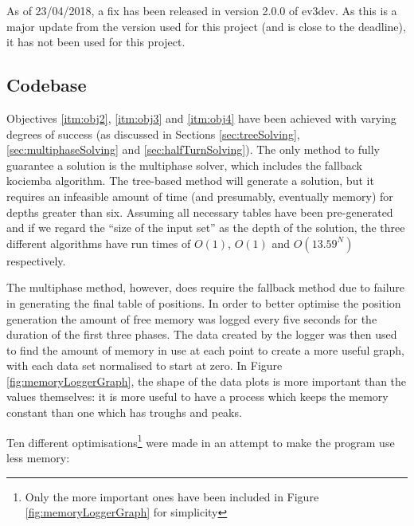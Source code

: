 \documentclass{report}
\newenvironment{aside}{\begin{mdframed}[style=0,%
		leftline=false,rightline=false,leftmargin=2em,rightmargin=2em,%
		innerleftmargin=0pt,innerrightmargin=0pt,linewidth=0.75pt,%
		skipabove=7pt,skipbelow=7pt]\small}
	{\end{mdframed}}
\begin{document}
    \begin{aside}
    	As of 23/04/2018, a fix has been released in version 2.0.0 of ev3dev. As this is a major update from the version used for this project (and is close to the deadline), it has not been used for this project.
    \end{aside}
    
    \subsection{Codebase} \label{sec:objectivesCodebase}
    
    Objectives \ref{itm:obj2}, \ref{itm:obj3} and \ref{itm:obj4} have been achieved with varying degrees of success (as discussed in Sections \ref{sec:treeSolving}, \ref{sec:multiphaseSolving} and \ref{sec:halfTurnSolving}). The only method to fully guarantee a solution is the multiphase solver, which includes the fallback kociemba algorithm. The tree-based method will generate a solution, but it requires an infeasible amount of time (and presumably, eventually memory) for depths greater than six. Assuming all necessary tables have been pre-generated and if we regard the \enquote{size of the input set} as the depth of the solution, the three different algorithms have run times of $O(1)$, $O(1)$ and $O(13.59^N)$ respectively.
    
    The multiphase method, however, does require the fallback method due to failure in generating the final table of positions. In order to better optimise the position generation the amount of free memory was logged every five seconds for the duration of the first three phases. The data created by the logger was then used to find the amount of memory in use at each point to create a more useful graph, with each data set normalised to start at zero. In Figure \ref{fig:memoryLoggerGraph}, the shape of the data plots is more important than the values themselves: it is more useful to have a process which keeps the memory constant than one which has troughs and peaks.
    
    Ten different optimisations\footnote{Only the more important ones have been included in Figure \ref{fig:memoryLoggerGraph} for simplicity} were made in an attempt to make the program use less memory:
    
\end{document}
